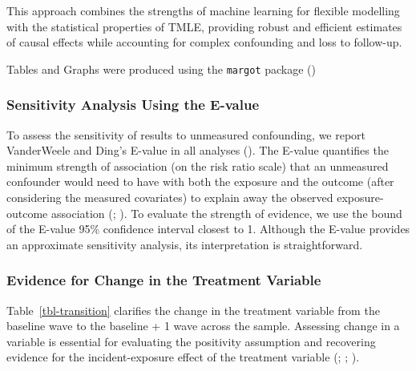 \documentclass[
  single column]{article}
\begin{document}
This approach combines the strengths of machine learning for flexible
modelling with the statistical properties of TMLE, providing robust and
efficient estimates of causal effects while accounting for complex
confounding and loss to follow-up.

Tables and Graphs were produced using the \texttt{margot} package
()

\subsubsection{Sensitivity Analysis Using the
E-value}\label{sensitivity-analysis-using-the-e-value}

To assess the sensitivity of results to unmeasured confounding, we
report VanderWeele and Ding's E-value in all analyses
(). The E-value
quantifies the minimum strength of association (on the risk ratio scale)
that an unmeasured confounder would need to have with both the exposure
and the outcome (after considering the measured covariates) to explain
away the observed exposure-outcome association
(;
). To evaluate
the strength of evidence, we use the bound of the E-value 95\%
confidence interval closest to 1. Although the E-value provides an
approximate sensitivity analysis, its interpretation is straightforward.

\subsubsection{Evidence for Change in the Treatment
Variable}\label{evidence-for-change-in-the-treatment-variable}

Table~\ref{tbl-transition} clarifies the change in the treatment
variable from the baseline wave to the baseline + 1 wave across the
sample. Assessing change in a variable is essential for evaluating the
positivity assumption and recovering evidence for the incident-exposure
effect of the treatment variable (; ;
).
\end{document}

